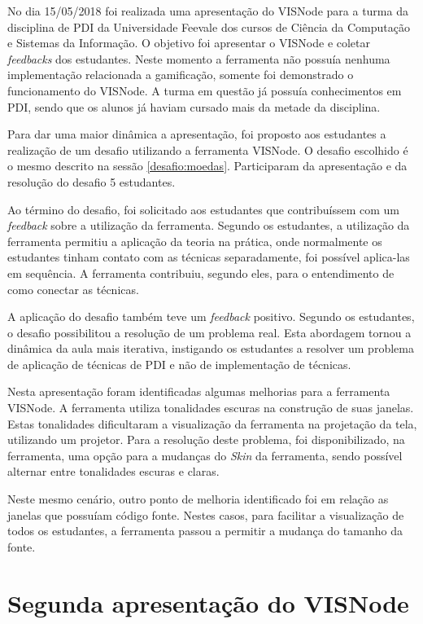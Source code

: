 \documentclass[
	12pt,				%
	oneside,			%
	a4paper,			%
	english,			%
	french,				%
	spanish,			%
	brazil,				%
	]{abntex2}
\begin{document}
No dia 15/05/2018 foi realizada uma apresentação do VISNode para a turma da disciplina de PDI da Universidade Feevale dos cursos de Ciência da Computação e Sistemas da Informação. O objetivo  foi apresentar o VISNode e coletar \textit{feedbacks} dos estudantes. Neste momento a ferramenta não possuía nenhuma implementação relacionada a gamificação, somente foi demonstrado o funcionamento do VISNode. A turma em questão já possuía conhecimentos em PDI, sendo que os alunos já haviam cursado mais da metade da disciplina.

Para dar uma maior dinâmica a apresentação, foi proposto aos estudantes a realização de um desafio utilizando a ferramenta VISNode. O desafio escolhido é o mesmo descrito na sessão \ref{desafio:moedas}. Participaram da apresentação e da resolução do desafio 5 estudantes.

Ao término do desafio, foi solicitado aos estudantes que contribuíssem com um \textit{feedback} sobre a utilização da ferramenta. Segundo os estudantes, a utilização da ferramenta permitiu a aplicação da teoria na prática, onde normalmente os estudantes tinham contato com as técnicas separadamente, foi possível aplica-las em sequência. A ferramenta contribuiu, segundo eles, para o entendimento de como conectar as técnicas.

A aplicação do desafio também teve um \textit{feedback} positivo. Segundo os estudantes, o desafio possibilitou a resolução de um problema real. Esta abordagem tornou a dinâmica da aula mais iterativa, instigando os estudantes a resolver um problema de aplicação de técnicas de PDI e não de implementação de técnicas.

Nesta apresentação foram identificadas algumas melhorias para a ferramenta VISNode. A ferramenta utiliza tonalidades escuras na construção de suas janelas. Estas tonalidades dificultaram a visualização da ferramenta na projetação da tela, utilizando um projetor. Para a resolução deste problema, foi disponibilizado, na ferramenta, uma opção para a mudanças do \textit{Skin} da ferramenta, sendo possível alternar entre tonalidades escuras e claras.

Neste mesmo cenário, outro ponto de melhoria identificado foi em relação as janelas que possuíam código fonte. Nestes casos, para facilitar a visualização de todos os estudantes, a ferramenta  passou a permitir a mudança do tamanho da fonte.

\section{Segunda apresentação do VISNode}
\end{document}
